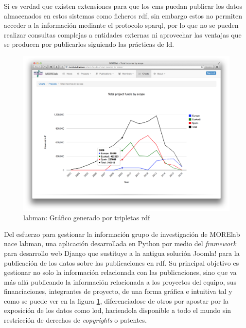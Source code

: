 Si es verdad que existen extensiones para que los \acrshort{cms} puedan publicar los datos almacenados en estos sistemas como ficheros \acrfull{rdf}, sin embargo estos no permiten acceder a la información mediante el protocolo \acrshort{sparql}, por lo que no se pueden realizar consultas complejas a entidades externas ni aprovechar las ventajas que se producen por publicarlos siguiendo las prácticas de \acrfull{ld}\cite{ld_benefits}.

\begin{figure}[!htp]
	\centering
	\includegraphics[scale=0.21]{fig/labman-chart}
	\caption{\acrshort{labman}: Gráfico generado por tripletas \acrshort{rdf}}\label{fig:labmanchart}
\end{figure}

Del esfuerzo para gestionar la información grupo de investigación de MORElab nace \acrshort{labman}, una aplicación desarrollada en Python\cite{Python} por medio del \textit{framework} para desarrollo web Django\cite{Django} que sustituye a la antigua solución Joomla! para la publicación de los datos sobre las publicaciones en \acrfull{rdf}\cite{RDF}. Su principal objetivo es gestionar no solo la información relacionada con las publicaciones, sino que va más allá publicando la información relacionada a los proyectos del equipo, sus financiaciones, integrantes de proyecto, de una forma gráfica e intuitiva tal y como se puede ver en la figura \ref{fig:labmanchart}, diferenciadose de otros  por apostar por la exposición de los datos como \acrlong{lod}\cite{linkeddata}, haciendola disponible a todo el mundo sin restricción de derechos de \textit{copyrights} o patentes.\cite{pena_visual_2014}